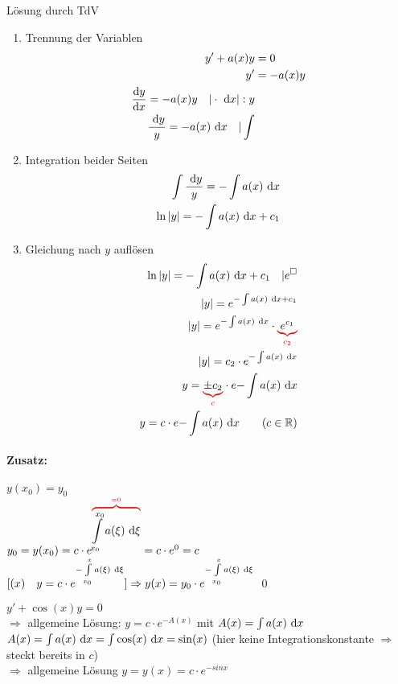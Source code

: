 \Beweis Lösung durch TdV
\begin{enumerate}
	\item Trennung der Variablen
	\begin{align*}
	y'+a(x)y&=0\\
	y'&=-a(x)y\\
	\dfrac{\mathrm{d}y}{\mathrm{d}x}=-a(x)y\quad|\cdot\ \mathrm{d}x|:y\\
	\dfrac{\ \mathrm{d}y}{y}=-a(x)\ \mathrm{d}x\quad|\int
	\end{align*}
	
	\item Integration beider Seiten
	\begin{align*}
	\int\dfrac{\ \mathrm{d}y}{y}=-\int a(x)\ \mathrm{d}x\\
	\ln|y|=-\int a(x)\ \mathrm{d}x+c_1
	\end{align*}
	
	\item Gleichung nach $y$ auflösen
	\begin{align*}
	\ln|y|=-\int a(x)\intd{x}+c_1\quad|e^{\square}\\
	|y|=e^{-\int a(x)\intd{x}+c_1}\\
	|y|=e^{-\int a(x)\intd{x}}\cdot\redunderbrace{e^{c_1}}{c_2}\\
	|y|=c_2\cdot e^{-\int a(x)\intd{x}}\\
	y=\redunderbrace{\pm c_2}{c}\cdot e{-\int a(x)\intd{x}}\\
	y=c\cdot e{-\int a(x)\intd{x}}\qquad(c\in\R)
	\end{align*}
\end{enumerate}

\paragraph{Zusatz:} $y(x_0)=y_0$\\
$y_0=y(x_0)=c\cdot e^{\redoverbrace{\int\limits_{x_0}^{x_0}a(\xi)\intd{\xi}}{=0}}=c\cdot e^0=c$\\
$[(x)\quad y=c\cdot e^{-\int\limits_{x_0}^{x}a(\xi)\ \mathrm{d}\xi}]\Rightarrow y(x)=y_0\cdot e^{-\int\limits_{x_0}^{x}a(\xi)\ \mathrm{d}\xi}$
\qed

\Bsp $y'+\cos(x)y=0$\\
$\Rightarrow$ allgemeine Lösung: $y=c\cdot e^{-A(x)}$ mit $A(x)=\int a(x)\ \mathrm{d}x$\\
$A(x)=\int a(x)\ \mathrm{d}x=\int\cos(x)\ \mathrm{d}x=\sin(x)$ (hier keine Integrationskonstante $\Rightarrow$ steckt bereits in $c$)\\
$\Rightarrow$ allgemeine Lösung $y=y(x)=c\cdot e^{-sin x}$

